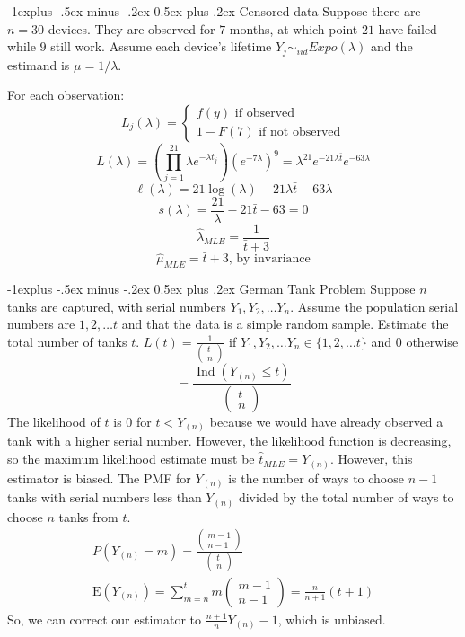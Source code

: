 \documentclass[10pt,landscape]{article}
\makeatletter
\renewcommand{\subsection}{\@startsection{subsection}{2}{0mm}%
                                {-1explus -.5ex minus -.2ex}%
                                {0.5ex plus .2ex}%
                                {\normalfont\normalsize\bfseries}}
\makeatother
\begin{document}
\begin{multicols*}{3}
\subsection{Censored data}
Suppose there are $n=30$ devices. They are observed for $7$ months, at which point $21$ have failed while $9$ still work. Assume each device's lifetime $Y_j \sim _{iid} Expo(\lambda)$ and the estimand is $\mu = 1/\lambda$. 

For each observation:
$$L_j(\lambda) = \begin{cases}f(y) \textrm{ if observed} \\ 1-F(7) \textrm{ if not observed} \end{cases}$$
$$L(\lambda) = \left(\prod_{j=1}^{21} \lambda e^{-\lambda t_j}\right) \left(e^{-7\lambda}\right)^9 = \lambda^{21}e^{-21\lambda\bar t}e^{-63\lambda}$$
$$\ell(\lambda) = 21\log(\lambda) - 21\lambda\bar t - 63 \lambda$$
$$s(\lambda) = \frac{21}{\lambda} - 21\bar t - 63 = 0$$
$$\hat\lambda_{MLE} = \frac{1}{\bar t +3}$$
$$\hat\mu_{MLE} = \bar t +3 \textrm{, by invariance}$$

\subsection{German Tank Problem}
Suppose $n$ tanks are captured, with serial numbers $Y_1, Y_2, \ldots Y_n$. Assume the population serial numbers are $1,2, \ldots t$ and that the data is a simple random sample. Estimate the total number of tanks $t$.
$L(t)=\frac{1}{\left(\begin{array}{l}t \\ n\end{array}\right)}$ if $Y_1, Y_2, \ldots Y_n \in\{1,2, \ldots t\}$ and 0 otherwise
$$
=\frac{\operatorname{Ind}\left(Y_{(n)} \leq t\right)}{\left(\begin{array}{l}
t \\
n
\end{array}\right)}
$$
The likelihood of $t$ is 0 for $t<Y_{(n)}$ because we would have already observed a tank with a higher serial number. However, the likelihood function is decreasing, so the maximum likelihood estimate must be $\hat{t}_{M L E}=Y_{(n)}$. However, this estimator is biased.
The PMF for $Y_{(n)}$ is the number of ways to choose $n-1$ tanks with serial numbers less than $Y_{(n)}$ divided by the total number of ways to choose $n$ tanks from $t$.
$$
\begin{gathered}
P\left(Y_{(n)}=m\right)=\frac{\left(\begin{array}{c}
m-1 \\
n-1
\end{array}\right)}{\left(\begin{array}{l}
t \\
n
\end{array}\right)} \\
\mathrm{E}\left(Y_{(n)}\right)=\sum_{m=n}^t m\left(\begin{array}{c}
m-1 \\
n-1
\end{array}\right)=\frac{n}{n+1}(t+1)
\end{gathered}
$$
So, we can correct our estimator to $\frac{n+1}{n} Y_{(n)}-1$, which is unbiased.


\end{multicols*}
\end{document}

